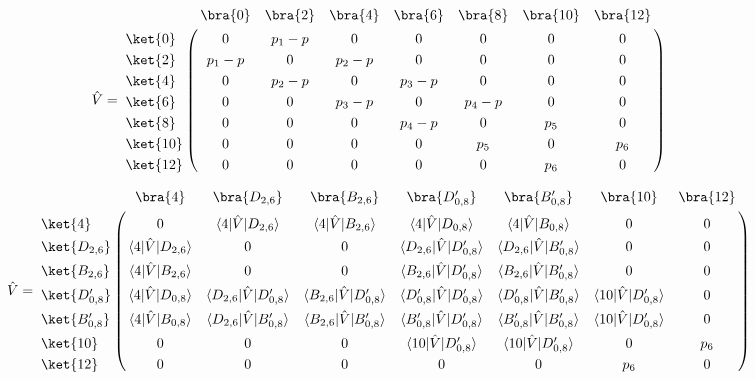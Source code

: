 \begin{align}
  \hat{V}&=
   \bordermatrix{     
    & \bra{0} &  \bra{2} &  \bra{4}&  \bra{6}&  \bra{8} &\bra{10} &\bra{12}\cr
   \ket{0}&0&p_1-p&0&0&0&0&0\cr
  \ket{2}&p_1-p&0&p_2-p&0&0&0&0\cr
  \ket{4}&0&p_2-p&0&p_3-p&0&0&0\cr
  \ket{6}&0&0&p_3-p&0&p_4-p&0&0\cr
  \ket{8}&0&0&0&p_4-p&0&p_5&0\cr
  \ket{10}&0&0&0&0&p_5&0&p_6\cr
  \ket{12}&0&0&0&0&0&p_6&0\cr}
\end{align}

\begin{align}
  \hat{V}&=
   \bordermatrix{     
    & \bra{4} &  \bra{D_{2,6}} &  \bra{B_{2,6}}&  \bra{D^\prime_{0,8}}&  \bra{B^\prime_{0,8}} &\bra{10} &\bra{12}\cr
   \ket{4}&0&\langle{4|\hat{V}|D_{2,6}}\rangle&\langle{4|\hat{V}|B_{2,6}}\rangle&\langle{4|\hat{V}|D_{0,8}}\rangle&\langle{4|\hat{V}|B_{0,8}}\rangle&0&0\cr
  \ket{D_{2,6}}&\langle{4|\hat{V}|D_{2,6}}\rangle&0&0&\langle{D_{2,6}|\hat{V}|D^\prime_{0,8}}\rangle&\langle{D_{2,6}|\hat{V}|B^\prime_{0,8}}\rangle&0&0\cr
  \ket{B_{2,6}}&\langle{4|\hat{V}|B_{2,6}}\rangle&0&0&\langle{B_{2,6}|\hat{V}|D^\prime_{0,8}}\rangle&\langle{B_{2,6}|\hat{V}|B^\prime_{0,8}}\rangle&0&0\cr
  \ket{D^\prime_{0,8}}&\langle{4|\hat{V}|D_{0,8}}\rangle&\langle{D_{2,6}|\hat{V}|D^\prime_{0,8}}\rangle&\langle{B_{2,6}|\hat{V}|D^\prime_{0,8}}\rangle& \langle{D^\prime_{0,8}|\hat{V}|D^\prime_{0,8}}\rangle& \langle{D^\prime_{0,8}|\hat{V}|B^\prime_{0,8}}\rangle&\langle{10|\hat{V}|D^\prime_{0,8}}\rangle&0\cr
  \ket{B^\prime_{0,8}}&\langle{4|\hat{V}|B_{0,8}}\rangle&\langle{D_{2,6}|\hat{V}|B^\prime_{0,8}}\rangle&\langle{B_{2,6}|\hat{V}|B^\prime_{0,8}}\rangle& \langle{B^\prime_{0,8}|\hat{V}|D^\prime_{0,8}}\rangle& \langle{B^\prime_{0,8}|\hat{V}|B^\prime_{0,8}}\rangle&\langle{10|\hat{V}|D^\prime_{0,8}}\rangle&0\cr
  \ket{10}&0&0&0&\langle{10|\hat{V}|D^\prime_{0,8}}\rangle&\langle{10|\hat{V}|D^\prime_{0,8}}\rangle&0&p_6\cr
  \ket{12}&0&0&0&0&0&p_6&0\cr}
\end{align}






